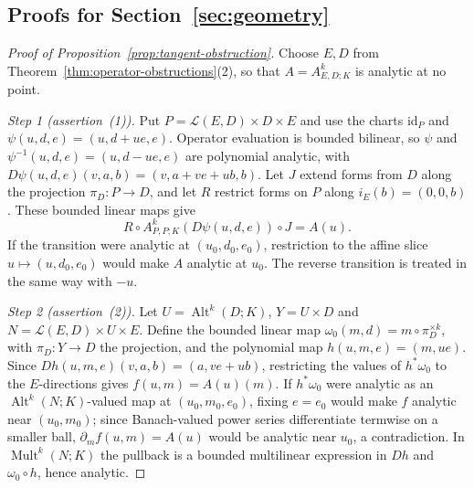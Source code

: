 \documentclass[11pt]{amsart}
\theoremstyle{definition}
\theoremstyle{remark}
\numberwithin{equation}{section}
\newcommand{\cL}{\mathcal L}
\newcommand{\Alt}{\operatorname{Alt}}
\newcommand{\Mult}{\operatorname{Mult}}
\newcommand{\id}{\mathrm{id}}
\theoremstyle{plain}
\theoremstyle{definition}
\theoremstyle{plain}
\begin{document}
\subsection{Proofs for Section~\ref{sec:geometry}}\label{dfr:ssec:geometry}

\begin{proof}[Proof of Proposition~\ref{prop:tangent-obstruction}]
Choose $E,D$ from Theorem~\ref{thm:operator-obstructions}(2), so that $A=A^k_{E,D;K}$ is analytic at no point.

\emph{Step 1 (assertion~(1)).} Put $P=\cL(E,D)\times D\times E$ and use the charts $\id_P$ and $\psi(u,d,e)=(u,d+ue,e)$. Operator evaluation is bounded bilinear, so $\psi$ and $\psi^{-1}(u,d,e)=(u,d-ue,e)$ are polynomial analytic, with $D\psi(u,d,e)(v,a,b)=(v,a+ve+ub,b)$. Let $J$ extend forms from $D$ along the projection $\pi_D\colon P\to D$, and let $R$ restrict forms on $P$ along $i_E(b)=(0,0,b)$. These bounded linear maps give
\[
 R\circ A^k_{P,P;K}(D\psi(u,d,e))\circ J=A(u).
\]
If the transition were analytic at $(u_0,d_0,e_0)$, restriction to the affine slice $u\mapsto(u,d_0,e_0)$ would make $A$ analytic at $u_0$. The reverse transition is treated in the same way with $-u$.

\emph{Step 2 (assertion~(2)).} Let $U=\Alt^k(D;K)$, $Y=U\times D$ and $N=\cL(E,D)\times U\times E$. Define the bounded linear map $\omega_0(m,d)=m\circ\pi_D^{\times k}$, with $\pi_D\colon Y\to D$ the projection, and the polynomial map $h(u,m,e)=(m,ue)$. Since $Dh(u,m,e)(v,a,b)=(a,ve+ub)$, restricting the values of $h^*\omega_0$ to the $E$\nobreakdash-directions gives $f(u,m)=A(u)(m)$. If $h^*\omega_0$ were analytic as an $\Alt^k(N;K)$\nobreakdash-valued map at $(u_0,m_0,e_0)$, fixing $e=e_0$ would make $f$ analytic near $(u_0,m_0)$; since Banach-valued power series differentiate termwise on a smaller ball, $\partial_mf(u,m)=A(u)$ would be analytic near $u_0$, a contradiction. In $\Mult^k(N;K)$ the pullback is a bounded multilinear expression in $Dh$ and $\omega_0\circ h$, hence analytic.
\end{proof}
\end{document}
